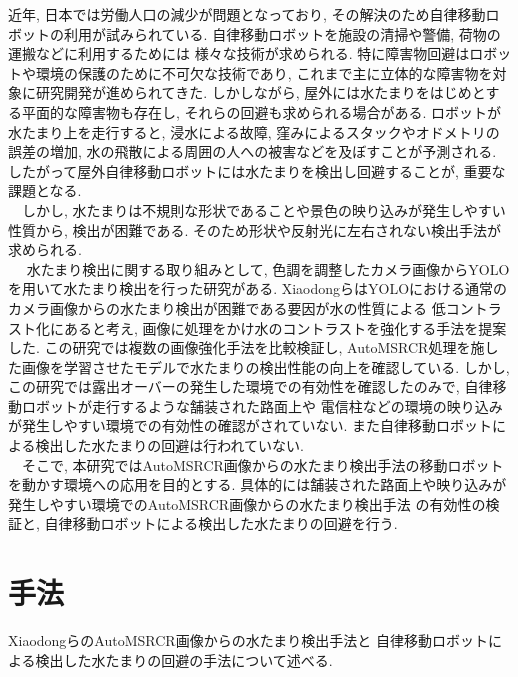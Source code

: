 \documentclass[10pt]{jarticle}
\begin{document}
    近年, 日本では労働人口の減少が問題となっており, 
    その解決のため自律移動ロボットの利用が試みられている. 
    自律移動ロボットを施設の清掃や警備, 荷物の運搬などに利用するためには
    様々な技術が求められる. 
    特に障害物回避はロボットや環境の保護のために不可欠な技術であり, 
    これまで主に立体的な障害物を対象に研究開発が進められてきた. 
    しかしながら, 屋外には水たまりをはじめとする平面的な障害物も存在し, 
    それらの回避も求められる場合がある. ロボットが水たまり上を走行すると, 
    浸水による故障, 窪みによるスタックやオドメトリの誤差の増加, 
    水の飛散による周囲の人への被害などを及ぼすことが予測される. 
    したがって屋外自律移動ロボットには水たまりを検出し回避することが, 
    重要な課題となる.\\ 
    　しかし, 水たまりは不規則な形状であることや景色の映り込みが発生しやすい性質から, 
    検出が困難である. そのため形状や反射光に左右されない検出手法が求められる.\\
    　 水たまり検出に関する取り組みとして, 
    色調を調整したカメラ画像からYOLOを用いて水たまり検出を行った研究がある. 
    Xiaodongら\cite{工大2005}はYOLOにおける通常のカメラ画像からの水たまり検出が困難である要因が水の性質による
    低コントラスト化にあると考え, 画像に処理をかけ水のコントラストを強化する手法を提案した. 
    この研究では複数の画像強化手法を比較検証し, 
    AutoMSRCR処理を施した画像を学習させたモデルで水たまりの検出性能の向上を確認している. 
    しかし, この研究では露出オーバーの発生した環境での有効性を確認したのみで, 
    自律移動ロボットが走行するような舗装された路面上や
    電信柱などの環境の映り込みが発生しやすい環境での有効性の確認がされていない.  
    また自律移動ロボットによる検出した水たまりの回避は行われていない. \\
    　そこで, 本研究ではAutoMSRCR画像からの水たまり検出手法の移動ロボットを動かす環境への応用を目的とする. 
    具体的には舗装された路面上や映り込みが発生しやすい環境でのAutoMSRCR画像からの水たまり検出手法
    の有効性の検証と, 自律移動ロボットによる検出した水たまりの回避を行う.


    \section{手法}%
        XiaodongらのAutoMSRCR画像からの水たまり検出手法と
        自律移動ロボットによる検出した水たまりの回避の手法について述べる. 
\end{document}
